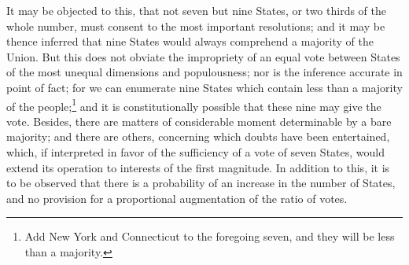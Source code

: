 It may be objected to this, that not seven but nine States, or two thirds of the whole number, must consent to the most important resolutions; and it may be thence inferred that nine States would always comprehend a majority of the Union. 
But this does not obviate the impropriety of an equal vote between States of the most unequal dimensions and populousness; nor is the inference accurate in point of fact; for we can enumerate nine States which contain less than a majority of the people;\footnote{Add New York and Connecticut to the foregoing seven, and they will be less than a majority.} and it is constitutionally possible that these nine may give the vote. 
Besides, there are matters of considerable moment determinable by a bare majority; and there are others, concerning which doubts have been entertained, which, if interpreted in favor of the sufficiency of a vote of seven States, would extend its operation to interests of the first magnitude. 
In addition to this, it is to be observed that there is a probability of an increase in the number of States, and no provision for a proportional augmentation of the ratio of votes.

